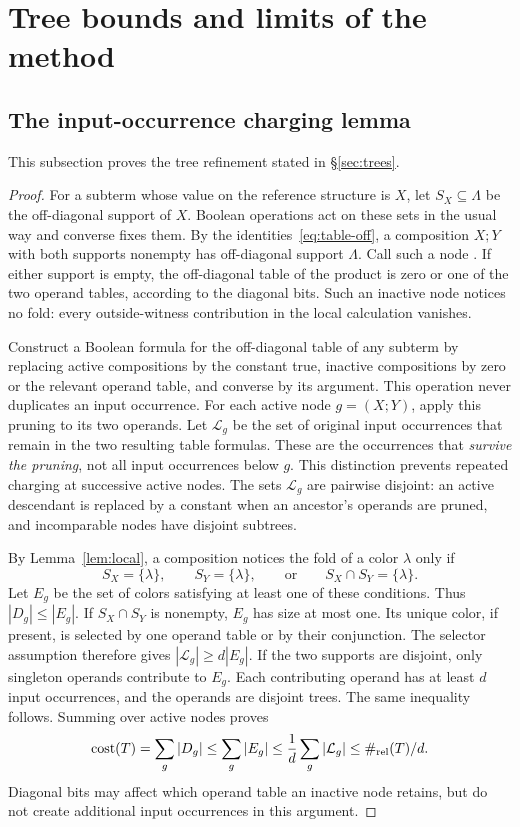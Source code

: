 \section{Tree bounds and limits of the method}\label{app:limits}
\subsection{The input-occurrence charging lemma}\label{app:trees}
This subsection proves the tree refinement stated in
\S\ref{sec:trees}.

\treecharging*
\begin{proof}
For a subterm whose value on the reference structure is $X$, let
$S_X\subseteq\Lambda$ be the off-diagonal support of $X$. Boolean operations
act on these sets in the usual way and converse fixes them. By the
identities~\eqref{eq:table-off}, a composition $X;Y$ with both supports nonempty
has off-diagonal support $\Lambda$. Call such a node .
If either support is empty, the off-diagonal table of the product is
zero or one of the two operand tables, according to the diagonal bits.
Such an inactive node notices no fold: every outside-witness
contribution in the local calculation vanishes.

Construct a Boolean formula for the off-diagonal table of any subterm
by replacing active compositions by the constant true, inactive
compositions by zero or the relevant operand table, and converse by
its argument. This operation never duplicates an input occurrence.
For each active node $g=(X;Y)$, apply this pruning to its two operands.
Let $\mathcal L_g$ be the set of original input occurrences that remain
in the two resulting table formulas. These are the occurrences that
\emph{survive the pruning}, not all input occurrences below $g$.
This distinction prevents repeated charging at successive active nodes.
The sets $\mathcal L_g$ are
pairwise disjoint: an active descendant is replaced by a constant when
an ancestor's operands are pruned, and incomparable nodes have disjoint
subtrees.

By Lemma~\ref{lem:local}, a composition notices the fold of a color
$\lambda$ only if
\[
 S_X=\{\lambda\},\qquad S_Y=\{\lambda\},\qquad\text{or}\qquad
 S_X\cap S_Y=\{\lambda\}.
\]
Let $E_g$ be the set of colors satisfying at least one of these
conditions. Thus $|D_g|\le|E_g|$. If $S_X\cap S_Y$ is nonempty,
$E_g$ has size at most one. Its unique color, if present, is selected
by one operand table or by their conjunction. The selector assumption
therefore gives $|\mathcal L_g|\ge d|E_g|$. If the two supports are
disjoint, only singleton operands contribute to $E_g$. Each contributing
operand has at least $d$ input occurrences, and the operands are disjoint
trees. The same inequality follows. Summing over active nodes proves
\[
 \operatorname{cost}(T)=\sum_g|D_g|\le\sum_g|E_g|
       \le\frac1d\sum_g|\mathcal L_g|\le \#_{\mathrm{rel}}(T)/d.
\]
Diagonal bits may affect which operand table an inactive node retains, but do not
create additional input occurrences in this argument.
\end{proof}

